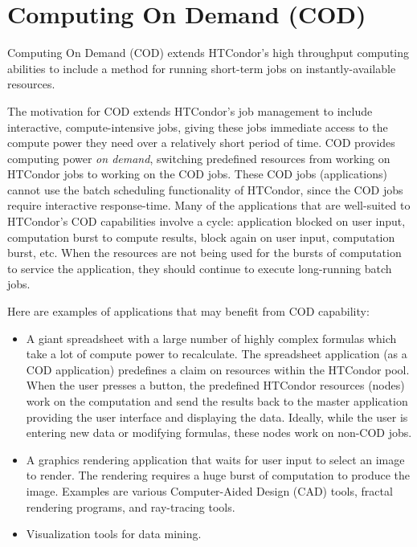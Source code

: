 \section{\label{sec:cod}Computing On Demand (COD)}

Computing On Demand (COD) extends HTCondor's high throughput
computing abilities to include
a method for running short-term jobs on instantly-available resources.

The motivation for COD extends HTCondor's job management to
include interactive, compute-intensive jobs,
giving these jobs immediate access to the
compute power they need over a relatively short period of time.
COD provides
computing power \emph{on demand}, 
switching predefined resources from working on HTCondor jobs
to working on the COD jobs. 
These COD jobs (applications) cannot use the batch
scheduling functionality of HTCondor, since the COD jobs require
interactive response-time.
Many of the applications that are well-suited to HTCondor's
COD capabilities involve a cycle:
application blocked on user input, computation burst to compute
results, block again on user input, computation burst, etc.
When the resources are not being used for the bursts of computation to
service the application, they should continue to execute
long-running batch jobs.

Here are examples of applications that may benefit from COD capability:

\begin{itemize}

\item A giant spreadsheet with a large number of highly complex
  formulas which take a lot of compute power to recalculate.
  The spreadsheet application (as a COD application) predefines
  a claim on resources within the HTCondor pool.
  When the user presses a \verb@recalculate@ button, 
  the predefined HTCondor resources (nodes) 
  work on the computation and send the results
  back to the master application providing the user interface and
  displaying the data.
  Ideally, while the user is entering new data or modifying formulas,
  these nodes work on non-COD jobs.

\item A graphics rendering application that waits for user
  input to select an image to render.
  The rendering requires a huge burst
  of computation to produce the image.
  Examples are various Computer-Aided Design (CAD) tools, fractal
  rendering programs, and ray-tracing tools.
 
\item Visualization tools for data mining.

\end{itemize}

